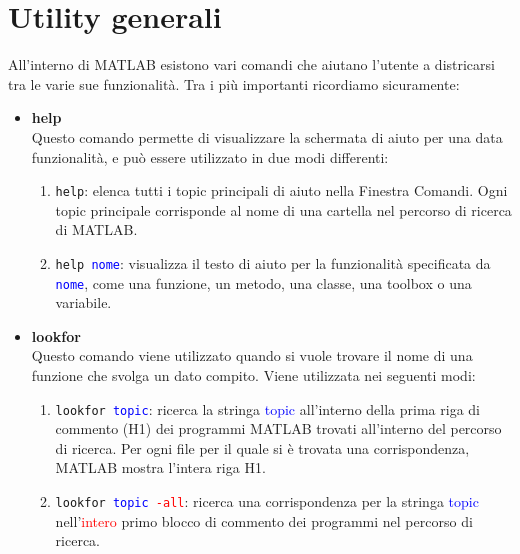 \chapter{Utility generali}
All'interno di MATLAB esistono vari comandi che aiutano l'utente a districarsi tra le varie sue funzionalità.
Tra i più importanti ricordiamo sicuramente:

\begin{itemize}
	
	\item 	\textbf{help} \\ 
		  	Questo comando permette di visualizzare la schermata di aiuto per una data funzionalità, e può essere 
		  	utilizzato in due modi differenti:
		  	\begin{enumerate}
		  	
				\item	\texttt{help}: elenca tutti i topic principali di aiuto nella Finestra Comandi. Ogni topic
						principale corrisponde al nome di una cartella nel percorso di ricerca di MATLAB.
						
				\item	\texttt{help \textcolor{blue}{nome}}: visualizza il testo di aiuto per la funzionalità 
						specificata da \texttt{\textcolor{blue}{nome}}, come una funzione, un metodo, una classe, 
						una toolbox o una variabile.
		  	
		  	\end{enumerate}
		  	
	\item	\textbf{lookfor} \\
			Questo comando viene utilizzato quando si vuole trovare il nome di una funzione che svolga un dato
			compito. Viene utilizzata nei seguenti modi:
			\begin{enumerate}
			
				\item 	\texttt{lookfor \textcolor{blue}{topic}}: ricerca la stringa \textcolor{blue}{topic}
						all'interno della prima riga di commento (H1) dei programmi MATLAB trovati all'interno del
						percorso di ricerca. Per ogni file per il quale si è trovata una corrispondenza, MATLAB
						mostra l'intera riga H1.
						
				\item 	\texttt{lookfor \textcolor{blue}{topic} \textcolor{red}{-all}}: ricerca una corrispondenza 
						per la stringa \textcolor{blue}{topic} nell'\textcolor{red}{intero} primo blocco di 
						commento dei programmi nel percorso di ricerca.
			
			\end{enumerate}
	
\end{itemize}